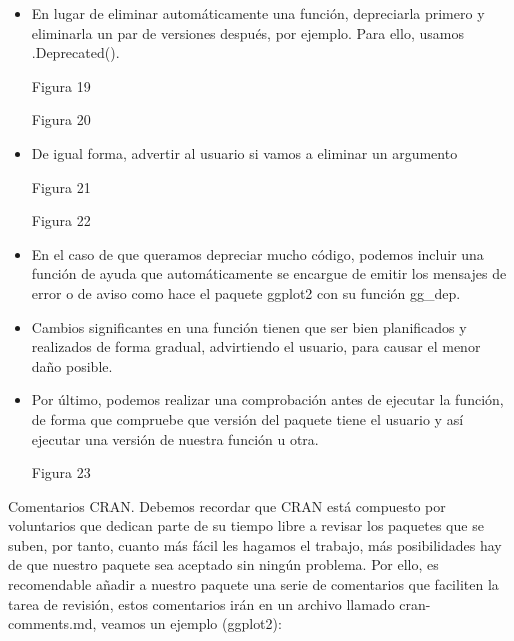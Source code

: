 \begin{itemize}
    \item En lugar de eliminar autom\'aticamente una funci\'on, depreciarla primero y eliminarla un
par de versiones despu\'es, por ejemplo. Para ello, usamos .Deprecated().

Figura 19

Figura 20

    \item De igual forma, advertir al usuario si vamos a eliminar un argumento

Figura 21

Figura 22

    \item En el caso de que queramos depreciar mucho c\'odigo, podemos incluir una funci\'on de
ayuda que autom\'aticamente se encargue de emitir los mensajes de error o de aviso
como hace el paquete ggplot2 con su funci\'on gg\_dep.
    \item Cambios significantes en una funci\'on tienen que ser bien planificados y realizados de
forma gradual, advirtiendo el usuario, para causar el menor da\~no posible.
    \item Por \'ultimo, podemos realizar una comprobaci\'on antes de ejecutar la funci\'on, de forma
que compruebe que versi\'on del paquete tiene el usuario y as\'i ejecutar una versi\'on de
nuestra funci\'on u otra.

Figura 23
\end{itemize}

Comentarios CRAN.
Debemos recordar que CRAN est\'a compuesto por voluntarios que dedican parte de su tiempo
libre a revisar los paquetes que se suben, por tanto, cuanto m\'as f\'acil les hagamos el trabajo,
m\'as posibilidades hay de que nuestro paquete sea aceptado sin ning\'un problema.
Por ello, es recomendable a\~nadir a nuestro paquete una serie de comentarios que faciliten la
tarea de revisi\'on, estos comentarios ir\'an en un archivo llamado cran-comments.md, veamos
un ejemplo (ggplot2):

